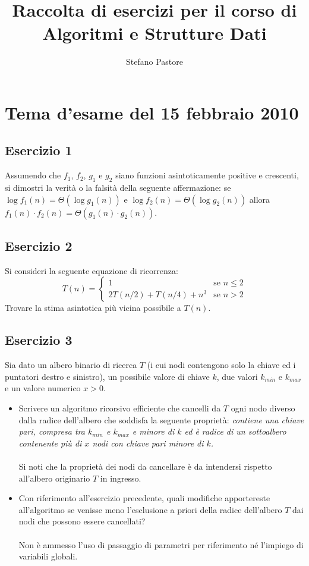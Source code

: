 \documentclass[11pt,a4paper,oneside]{article}
\title{Raccolta di esercizi per il corso di\\\Huge{Algoritmi e Strutture Dati}}
\author{Stefano Pastore}
\begin{document}
\maketitle
\pagebreak
%
%
\section*{Tema d'esame del 15 febbraio 2010}
\subsection*{Esercizio 1} Assumendo che $f_1$, $f_2$, $g_1$ e $g_2$ siano funzioni asintoticamente positive e crescenti, si dimostri la verità o la falsità della seguente affermazione: se
$\log{f_1(n)} = \Theta(\log{g_1(n)})$ e \linebreak $\log{f_2(n)} = \Theta(\log{g_2(n)})$
allora $f_1(n) \cdot f_2(n) = \Theta(g_1(n) \cdot g_2(n))$.
\subsection*{Esercizio 2} Si consideri la seguente equazione di ricorrenza:
$$
T(n) = 
\begin{cases}
1 & \text{se } n \leq 2 \\
2T(n/2)+T(n/4)+n^3& \text{se } n > 2
\end{cases}
$$
Trovare la stima asintotica più vicina possibile a $T(n)$.
\subsection*{Esercizio 3} Sia dato un albero binario di ricerca $T$ (i cui nodi contengono solo la chiave ed i puntatori destro e sinistro), un possibile valore di chiave $k$, due valori $k_{min}$ e $k_{max}$ e un valore numerico $x > 0$.
\begin{itemize}
	\item Scrivere un algoritmo ricorsivo efficiente che cancelli da $T$ ogni nodo diverso dalla radice dell'albero che soddisfa la seguente proprietà: \textit{contiene una chiave pari, compresa tra $k_{min}$ e $k_{max}$ e minore di $k$ ed è radice di un sottoalbero contenente più di $x$ nodi con chiave pari minore di $k$.}\\\\Si noti che la proprietà dei nodi da cancellare è da intendersi rispetto all'albero originario $T$ in ingresso.
	\item Con riferimento all'esercizio precedente, quali modifiche apportereste all'algoritmo se venisse meno l'esclusione a priori della radice dell'albero $T$ dai nodi che possono essere cancellati?\\\\Non è ammesso l'uso di passaggio di parametri per riferimento né l'impiego di variabili globali.
\end{itemize}
\end{document}
